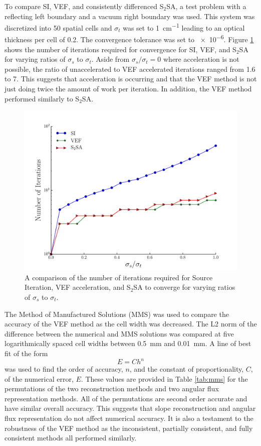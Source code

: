 To compare SI, VEF, and consistently differenced S$_2$SA, a test problem with a reflecting left boundary and a vacuum right boundary was used. This system was discretized into 50 spatial cells and $\sigma_t$ was set to \SI{1}{cm^{-1}} leading to an optical thickness per cell of 0.2. The convergence tolerance was set to \num{e-6}. Figure \ref{fig:si_vef_s2sa} shows the number of iterations required for convergence for SI, VEF, and S$_2$SA for varying ratios of $\sigma_s$ to $\sigma_t$. Aside from $\sigma_s/\sigma_t = 0$ where acceleration is not possible, the ratio of unaccelerated to VEF accelerated iterations ranged from 1.6 to 7. This suggests that acceleration is occurring and that the VEF method is not just doing twice the amount of work per iteration. In addition, the VEF method performed similarly to S$_2$SA. 

	\begin{figure}
		\centering
		\includegraphics[width=.75\textwidth]{figs/si_vef_s2sa.pdf} 
		\caption{A comparison of the number of iterations required for Source Iteration, VEF acceleration, and S$_2$SA to converge for varying ratios of $\sigma_s$ to $\sigma_t$. } 
		\label{fig:si_vef_s2sa}
	\end{figure}

The Method of Manufactured Solutions (MMS) was used to compare the accuracy of the VEF method as the cell width was decreased. The L2 norm of the difference between the numerical and MMS solutions was compared at five logarithmically spaced cell widths between \SI{0.5}{mm} and \SI{0.01}{mm}. A line of best fit of the form 
	\begin{equation}
		E = C h^n
	\end{equation}
was used to find the order of accuracy, $n$, and the constant of proportionality, $C$, of the numerical error, $E$. These values are provided in Table \ref{tab:mms} for the permutations of the two reconstruction methods and two angular flux representation methods. All of the permutations are second order accurate and have similar overall accuracy. This suggests that slope reconstruction and angular flux representation do not affect numerical accuracy. It is also a testament to the robustness of the VEF method as the inconsistent, partially consistent, and fully consistent methods all performed similarly. 

